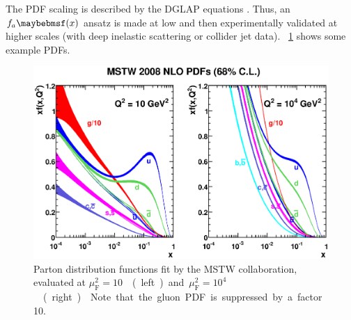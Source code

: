 The PDF \muf scaling is described by the DGLAP equations 
\cite{Gribov:1972,Altarelli:1977,Dokshitser:1977}. Thus, an $f_a \parenths{x}$ ansatz is 
made at low \muf and then experimentally validated at higher scales (\eg with deep 
inelastic scattering or collider jet data). \Figure~\ref{fig:qcd:pdf} shows some example 
PDFs.

\begin{figure}[t]
	\includegraphics[width=\largefigwidth]{tex/tools/pdf}
	\caption{Parton distribution functions fit by the MSTW collaboration, evaluated at 
	\unit{$\mu_{\text{F}}^2 = 10$}{\GeV\squared} (left) and 
	\unit{$\mu_{\text{F}}^2 = 10^4$}{\GeV\squared} (right) \cite{MSTW}. Note that the 
	gluon PDF is suppressed by a factor 10.}
	\label{fig:qcd:pdf}
\end{figure}
